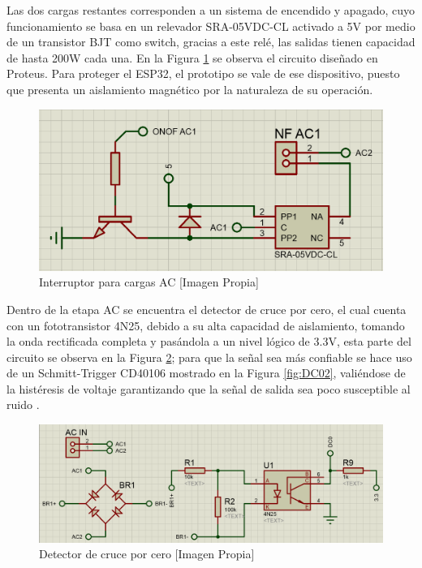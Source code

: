 		Las dos cargas restantes corresponden a un sistema de encendido y apagado, cuyo funcionamiento se basa en un relevador SRA-05VDC-CL activado a 5V por medio de un transistor BJT como switch, gracias a este relé, las salidas tienen capacidad de hasta 200W cada una. En la Figura \ref{fig:ONOFAC} se observa el circuito diseñado en Proteus. Para proteger el ESP32, el prototipo se vale de ese dispositivo, puesto que presenta un aislamiento magnético por la naturaleza de su operación.\\
	
		\begin{figure}[H]
			\centering
			\caption{Interruptor para cargas AC [Imagen Propia]}
			\label{fig:ONOFAC}
			\includegraphics[width=0.7\linewidth]{Imagenes/ONOFAC}
		\end{figure}
	
		Dentro de la etapa AC se encuentra el detector de cruce por cero, el cual cuenta con un fototransistor 4N25, debido a su alta capacidad de aislamiento, tomando la onda rectificada completa y pasándola a un nivel lógico de 3.3V, esta parte del circuito se observa en la Figura \ref{fig:DC01}; para que la señal sea más confiable se hace uso de un Schmitt-Trigger CD40106 mostrado en la Figura \ref{fig:DC02}, valiéndose de la histéresis de voltaje garantizando que la señal de salida sea poco susceptible al ruido \cite{DC0}.\\
		
		\begin{figure}[H]
			\centering
			\caption{Detector de cruce por cero [Imagen Propia]}
			\label{fig:DC01}
			\includegraphics[width=0.85\linewidth]{Imagenes/DC01}
		\end{figure}
	
